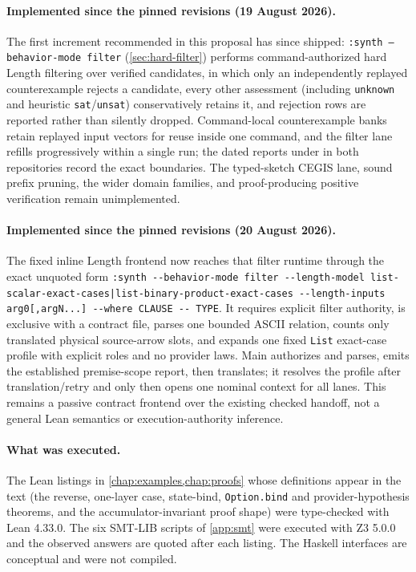 \documentclass[11pt,oneside]{report}
\newcommand{\code}[1]{\texttt{#1}}
\begin{document}
\paragraph{Implemented since the pinned revisions (19 August 2026).} The first increment recommended in this proposal has since shipped: \code{:synth --behavior-mode filter} (\cref{sec:hard-filter}) performs command-authorized hard Length filtering over verified candidates, in which only an independently replayed counterexample rejects a candidate, every other assessment (including \texttt{unknown} and heuristic \texttt{sat}/\texttt{unsat}) conservatively retains it, and rejection rows are reported rather than silently dropped. Command-local counterexample banks retain replayed input vectors for reuse inside one command, and the filter lane refills progressively within a single run; the dated reports under  in both repositories record the exact boundaries. The typed-sketch CEGIS lane, sound prefix pruning, the wider domain families, and proof-producing positive verification remain unimplemented.

\paragraph{Implemented since the pinned revisions (20 August 2026).} The fixed
inline Length frontend now reaches that filter runtime through the exact
unquoted form
\code{:synth -{}-behavior-mode filter -{}-length-model
list-scalar-exact-cases|list-binary-product-exact-cases
-{}-length-inputs arg0[,argN...] -{}-where CLAUSE -{}- TYPE}. It requires
explicit filter authority, is exclusive with a contract file, parses one
bounded ASCII relation, counts only translated physical source-arrow slots,
and expands one fixed \code{List} exact-case profile with explicit roles and no
provider laws. Main authorizes and parses, emits the established premise-scope
report, then translates; it resolves the profile after translation/retry and
only then opens one nominal context for all lanes. This remains a passive
contract frontend over the existing checked handoff, not a general Lean
semantics or execution-authority inference.

\paragraph{What was executed.} The Lean listings in \cref{chap:examples,chap:proofs} whose definitions appear in the text (the reverse, one-layer case, state-bind, \code{Option.bind} and provider-hypothesis theorems, and the accumulator-invariant proof shape) were type-checked with Lean 4.33.0. The six SMT-LIB scripts of \cref{app:smt} were executed with Z3 5.0.0 and the observed answers are quoted after each listing. The Haskell interfaces are conceptual and were not compiled.
\end{document}
